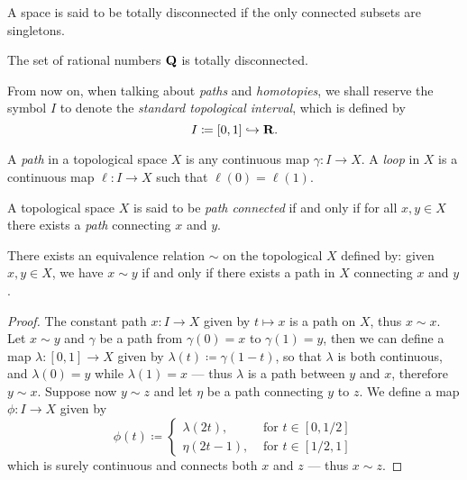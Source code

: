 \begin{definition}
\label{def:totally-disconnected}
A space is said to be totally disconnected if the only connected subsets are
singletons.
\end{definition}

\begin{example}
\label{exp:Q-is-totally-disconnected}
The set of rational numbers \(\mathbf{Q}\) is totally disconnected.
\end{example}

\begin{notation}
From now on, when talking about \emph{paths} and \emph{homotopies}, we shall
reserve the symbol \(I\) to denote the \emph{standard topological interval},
which is defined by
\[
  I \coloneq [0, 1] \hookrightarrow \mathbf{R}.
\]
\end{notation}

\begin{definition}
\label{def:path-loop}
A \emph{path} in a topological space \(X\) is any continuous map \(\gamma: I \to
X\). A \emph{loop} in \(X\) is a continuous map \(\ell: I \to X\) such that
\(\ell(0) = \ell(1)\).
\end{definition}

\begin{definition}
\label{def:path-connected}
A topological space \(X\) is said to be \emph{path connected} if and only if
for all \(x, y \in X\) there exists a \emph{path} connecting \(x\) and \(y\).
\end{definition}

\begin{proposition}
\label{prop:path-connected-equiv-relation}
There exists an equivalence relation \(\sim\) on the topological \(X\) defined
by: given \(x, y \in X\), we have \(x \sim y\) if and only if there exists a
path in \(X\) connecting \(x\) and \(y\).
\end{proposition}

\begin{proof}
The constant path \(x: I \to X\) given by \(t \mapsto x\) is a path on \(X\),
thus \(x \sim x\). Let \(x \sim y\) and \(\gamma\) be a path from
\(\gamma(0) = x\) to \(\gamma(1) = y\), then we can define a map
\(\lambda: [0, 1] \to X\) given by \(\lambda(t) \coloneq \gamma(1 - t)\), so
that \(\lambda\) is both continuous, and \(\lambda(0) = y\) while
\(\lambda(1) = x\) --- thus \(\lambda\) is a path between \(y\) and \(x\),
therefore \(y \sim x\). Suppose now \(y \sim z\) and let \(\eta\) be a path
connecting \(y\) to \(z\). We define a map \(\phi: I \to X\) given by
\[
  \phi(t) \coloneq
  \begin{cases}
    \lambda(2t), &\text{ for } t \in [0, 1/2] \\
    \eta(2t - 1), &\text{ for } t \in [1/2, 1]
  \end{cases}
\]
which is surely continuous and connects both \(x\) and \(z\) --- thus \(x \sim
z\).
\end{proof}

